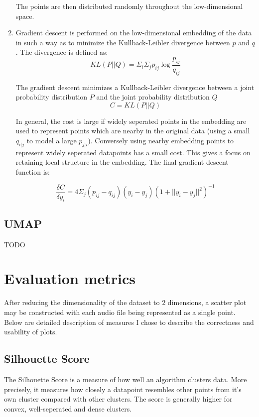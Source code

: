 \documentclass[a4paper, 12pt, twoside]{report}
\begin{document}
\begin{enumerate}
    The points are then distributed randomly throughout the low-dimensional space.

    \item Gradient descent is performed on the low-dimensional embedding of the data in such a way as to minimize the Kullback-Leibler divergence between $p$ and $q$. The divergence is defined as:
    \[ KL(P || Q) = \Sigma_{i}\Sigma_{j}p_{ij}\log \frac{p_{ij}}{q_{ij}} \]

    The gradient descent minimizes a Kullback-Leibler divergence between a joint probability distribution $P$ and the joint probability distribution $Q$
    \[ C = KL(P||Q)\]

    In general, the cost is large if widely seperated points in the embedding are used to represent points which are nearby in the original data (using a small $q_{i|j}$ to model a large $p_{j|i}$). Conversely using nearby embedding points to represent widely seperated datapoints has a small cost. This gives a focus on retaining local structure in the embedding. The final gradient descent function is:

    \[ \frac{\delta C}{\delta y_{i}} = 4 \Sigma_{j}(p_{ij} - q_{ij})(y_{i} - y_{j})(1 + ||y_{i} - y_{j}||^{2})^{-1} \]

\end{enumerate}

\subsection{UMAP}
\label{sec:org6a758a8}
TODO

\section{Evaluation metrics}
\label{sec:org078e27c}

After reducing the dimensionality of the dataset to 2 dimensions, a scatter plot may be constructed with each audio file being represented as a single point. Below are detailed description of measures I chose to describe the correctness and usability of plots.
\subsection{Silhouette Score}
\label{sec:org8d91088}
The Silhouette Score is a measure of how well an algorithm clusters data. More precisely, it measures how closely a datapoint resembles other points from it's own cluster compared with other clusters. The score is generally higher for convex, well-seperated and dense clusters.
\end{document}
